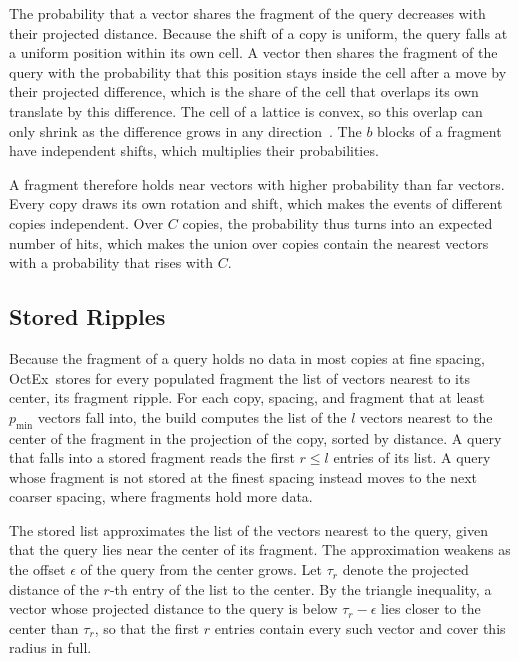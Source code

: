 \documentclass[letterpaper,twocolumn,10pt]{article}
\newcommand{\sysname}{OctEx}
\begin{document}
The probability that a vector shares the fragment of the query decreases with their projected distance. Because the shift of a copy is uniform, the query falls at a uniform position within its own cell. A vector then shares the fragment of the query with the probability that this position stays inside the cell after a move by their projected difference, which is the share of the cell that overlaps its own translate by this difference. The cell of a lattice is convex, so this overlap can only shrink as the difference grows in any direction~\cite{conway1999splag}. The $b$ blocks of a fragment have independent shifts, which multiplies their probabilities.

A fragment therefore holds near vectors with higher probability than far vectors. Every copy draws its own rotation and shift, which makes the events of different copies independent. Over $C$ copies, the probability thus turns into an expected number of hits, which makes the union over copies contain the nearest vectors with a probability that rises with $C$.

\subsection{Stored Ripples}
\label{sec:ripples}

Because the fragment of a query holds no data in most copies at fine spacing, \sysname\ stores for every populated fragment the list of vectors nearest to its center, its fragment ripple. For each copy, spacing, and fragment that at least $p_{\min}$ vectors fall into, the build computes the list of the $l$ vectors nearest to the center of the fragment in the projection of the copy, sorted by distance. A query that falls into a stored fragment reads the first $r \leq l$ entries of its list. A query whose fragment is not stored at the finest spacing instead moves to the next coarser spacing, where fragments hold more data.

The stored list approximates the list of the vectors nearest to the query, given that the query lies near the center of its fragment. The approximation weakens as the offset $\epsilon$ of the query from the center grows. Let $\tau_r$ denote the projected distance of the $r$-th entry of the list to the center. By the triangle inequality, a vector whose projected distance to the query is below $\tau_r - \epsilon$ lies closer to the center than $\tau_r$, so that the first $r$ entries contain every such vector and cover this radius in full.
\end{document}
